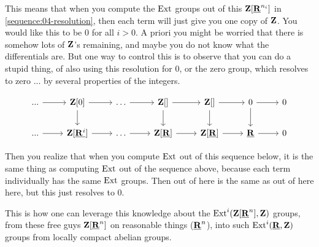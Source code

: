 This means that when you compute the $\operatorname{Ext}$ groups out of this $\mathbf Z[\underline{\mathbf R}^{n_i}]$ in \ref{sequence:04-resolution}, then each term will just give you one copy of $\mathbf Z$. You would like this to be $0$ for all $i > 0$. 
A priori you might be worried that there is somehow lots of $\mathbf Z$'s remaining, and maybe you do not know what the differentials are. But one way to control this is to observe that you can do a stupid thing, of also using this resolution for 0, or the zero group, which resolves to zero ...  by several properties of the integers.

\begin{example}
\[\begin{tikzcd}
	{...} & {\Z[0]} & \ldots & {\Z[]} & {\Z[]} & 0 & 0 \\
	{...} & {\Z[\underline{\R^i}]} & \ldots & {\Z[\Rcond]} & {\Z[\Rcond]} & {\Rcond} & 0
	\arrow[from=1-1, to=1-2]
	\arrow[from=1-2, to=1-3]
	\arrow[from=1-2, to=2-2]
	\arrow[from=1-3, to=1-4]
	\arrow[from=1-4, to=1-5]
	\arrow[from=1-4, to=2-4]
	\arrow[from=1-5, to=1-6]
	\arrow[from=1-5, to=2-5]
	\arrow[from=1-6, to=1-7]
	\arrow[from=1-6, to=2-6]
	\arrow[from=2-1, to=2-2]
	\arrow[from=2-2, to=2-3]
	\arrow[from=2-3, to=2-4]
	\arrow[from=2-4, to=2-5]
	\arrow[from=2-5, to=2-6]
	\arrow[from=2-6, to=2-7]
\end{tikzcd}\]
\end{example}

Then you realize that when you compute $\operatorname{Ext}$ out of this sequence below, it is the same thing as computing $\operatorname{Ext}$ out of the sequence above, because each term individually has the same $\operatorname{Ext}$ groups. Then out of here is the same as out of here here, but this just resolves to 0.

This is how one can leverage this knowledge about the $\operatorname{Ext}^i(\mathbf Z[\underline{\mathbf R}^n], \mathbf Z)$ groups, from these free guys $\mathbf Z[\underline{\mathbf R}^n]$ on reasonable things ($\underline{\mathbf R}^n$), into such $\operatorname{Ext}^i(\underline{\mathbf R},\mathbf Z)$ groups from locally compact abelian groups.

